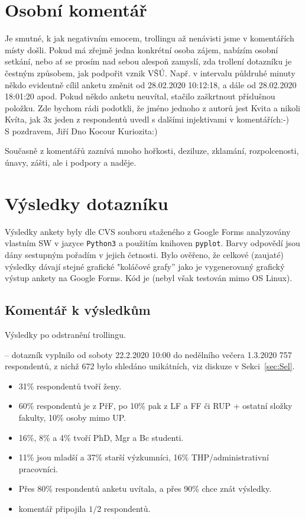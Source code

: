 \documentclass[a4paper,twoside]{article}
\begin{document}
\section{Osobní komentář}
Je smutné, k jak negativním emocem, trollingu až nenávisti jsme v komentářích místy došli.
Pokud má zřejmě jedna konkrétní osoba zájem, nabízím osobní setkání, nebo ať se prosím nad sebou alespoň zamyslí, zda trollení dotazníku je čestným způsobem, jak podpořit vznik VŠÚ. Např. v intervalu půldruhé minuty někdo evidentně cílil anketu změnit od 28.02.2020 10:12:18, a dále od 28.02.2020 18:01:20 apod.
Pokud někdo anketu neuvítal, stačilo zaškrtnout příslušnou položku. Zde bychom rádi podotkli, že jméno jednoho z autorů jest Kvita a nikoli Kvíta, jak 3x jeden z respondentů uvedl s dalšími injektivami v komentářích:-) \\ S pozdravem, Jiří Dno Kocour Kuriozita:)

Současně z komentářů zaznívá mnoho hořkosti, deziluze, zklamání, rozpolcenosti, únavy, zášti, ale i podpory a naděje.

\section{Výsledky dotazníku}
Výsledky ankety byly dle CVS souboru staženého z Google Forms analyzovány vlastním SW v jazyce {\tt Python3} a použitím knihoven {\tt pyplot}.
Barvy odpovědí jsou dány sestupným pořadím v jejich četnosti.
Bylo ověřeno, že celkové (zaujaté) výsledky dávají stejné grafické "koláčové grafy'' jako je vygenerovaný grafický výstup ankety na Google Forms.
Kód je  (nebyl však testován mimo OS Linux).

\subsection{Komentář k výsledkům}

Výsledky po odstranění trollingu.

 -- dotazník vyplnilo od soboty 22.2.2020 10:00 do nedělního večera 1.3.2020 757 respondentů, z nichž 672 bylo shledáno unikátních, viz diskuze v Sekci~\ref{sec:Sel}.
\begin{itemize}
  \item 31\% respondentů tvoří ženy.
  \item 60\% respondentů je z PřF, po 10\% pak z LF a FF či RUP + ostatní složky fakulty, 10\% osoby mimo UP.
  \item 16\%, 8\% a 4\% tvoří PhD, Mgr a Bc studenti.
  \item 11\% jsou mladší a 37\% starší výzkumníci, 16\% THP/administrativní pracovníci.
  \item Přes 80\% respondentů anketu uvítala, a přes 90\% chce znát výsledky.
  \item komentář připojila $1/2$ respondentů.
\end{itemize}
\end{document}
